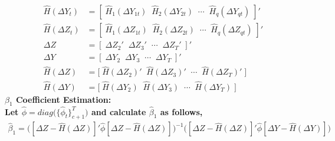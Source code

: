 \documentclass[10pt]{article}
\begin{document}
%
 \begin{align*}
   \hat{H}(\Delta Y_t)  &= [ \; \hat{H}_1(\Delta Y_{1t}) \;\; \hat{H}_2(\Delta Y_{2t}) \;\; \cdots \;\; \hat{H}_q(\Delta Y_{qt}) \; ]'\\
%
\hat{H}(\Delta Z_t)  &= [ \; \hat{H}_1(\Delta Z_{1t}) \;\; \hat{H}_2(\Delta Z_{2t}) \;\; \cdots \;\; \hat{H}_q(\Delta Z_{qt}) \; ]'\\
%
\Delta Z &= [ \; \Delta Z_{2}' \;\; \Delta Z_{3}' \;\; \cdots \;\; \Delta Z_{T}' \;]' \\
%
 \Delta Y &= [ \; \Delta Y_{2} \;\; \Delta Y_{3} \;\; \cdots \;\; \Delta Y_{T} \;]' \\
%
\hat{H}(\Delta Z) &= \big[\; \hat{H}(\Delta Z_{2})' \;\; \hat{H}(\Delta Z_{3})' \;\;\cdots \;\; \hat{H}(\Delta Z_{T})' \; \big] \\
%
 \hat{H}(\Delta Y) &= \big[\; \hat{H}(\Delta Y_{2}) \;\; \hat{H}(\Delta Y_{3}) \;\;\cdots \;\; \hat{H}(\Delta Y_{T}) \; \big]
\end{align*}
%
\noindent \bf $\beta_1$ Coefficient Estimation:\rm \\
%
 Let $\hat{\phi} = diag\big( \{\hat{\phi}_t\}_{c+1}^T \big)$ and calculate $\hat{\beta}_1$ as follows,
    \begin{align*}
  \hat{\beta}_1 = \Big( [\Delta Z - \hat{H}(\Delta Z)]' \hat{\phi} [\Delta Z - \hat{H}(\Delta Z)] \Big)^{-1} \Big( [\Delta Z - \hat{H}(\Delta Z)]' \hat{\phi} [\Delta Y - \hat{H}(\Delta Y)] \Big)
    \end{align*}
\newpage
\end{document}
